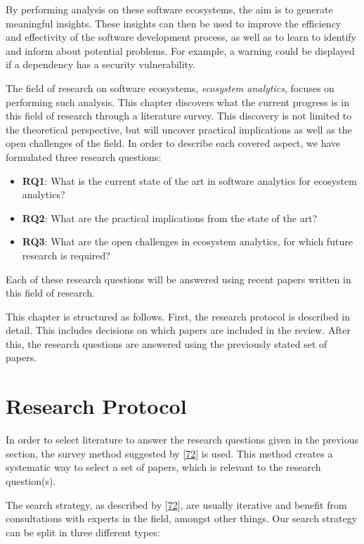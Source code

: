 \documentclass[]{book}
\providecommand{\tightlist}{%
  \setlength{\itemsep}{0pt}\setlength{\parskip}{0pt}}
\begin{document}
By performing analysis on these software ecosystems, the aim is to
generate meaningful insights. These insights can then be used to improve
the efficiency and effectivity of the software development process, as
well as to learn to identify and inform about potential problems. For
example, a warning could be displayed if a dependency has a security
vulnerability.

The field of research on software ecosystems, \emph{ecosystem
analytics}, focuses on performing such analysis. This chapter discovers
what the current progress is in this field of research through a
literature survey. This discovery is not limited to the theoretical
perspective, but will uncover practical implications as well as the open
challenges of the field. In order to describe each covered aspect, we
have formulated three research questions:

\begin{itemize}
\tightlist
\item
  \textbf{RQ1}: What is the current state of the art in software
  analytics for ecosystem analytics?
\item
  \textbf{RQ2}: What are the practical implications from the state of
  the art?
\item
  \textbf{RQ3}: What are the open challenges in ecosystem analytics, for
  which future research is required?
\end{itemize}

Each of these research questions will be answered using recent papers
written in this field of research.

This chapter is structured as follows. First, the research protocol is
described in detail. This includes decisions on which papers are
included in the review. After this, the research questions are answered
using the previously stated set of papers.

\section{Research Protocol}\label{research-protocol-2}

In order to select literature to answer the research questions given in
the previous section, the survey method suggested by
{[}\protect\hyperlink{ref-Kitchenham2004}{72}{]} is used. This method
creates a systematic way to select a set of papers, which is relevant to
the research question(s).

The search strategy, as described by
{[}\protect\hyperlink{ref-Kitchenham2004}{72}{]}, are usually iterative
and benefit from consultations with experts in the field, amongst other
things. Our search strategy can be split in three different types:
\end{document}
